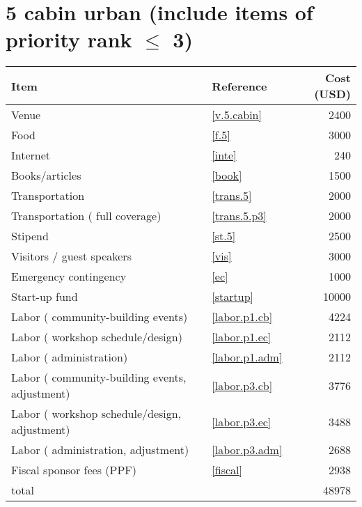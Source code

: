 \section*{5 cabin urban (include items of priority rank $\leq$ 3)}
\begin{center}
\begin{tabular}{llr}
Item & Reference & Cost (USD) \\ \hline
Venue & \ref{v.5.cabin} & 2400 \\
Food & \ref{f.5} & 3000 \\
Internet & \ref{inte} & 240 \\
Books/articles & \ref{book} & 1500 \\
Transportation & \ref{trans.5} & 2000 \\
Transportation ( full coverage) & \ref{trans.5.p3} & 2000 \\
Stipend & \ref{st.5} & 2500 \\
Visitors / guest speakers & \ref{vis} & 3000 \\
Emergency contingency & \ref{ec} & 1000 \\
Start-up fund & \ref{startup} & 10000 \\
Labor ( community-building events) & \ref{labor.p1.cb} & 4224 \\
Labor ( workshop schedule/design) & \ref{labor.p1.ec} & 2112 \\
Labor ( administration) & \ref{labor.p1.adm} & 2112 \\
Labor ( community-building events, adjustment) & \ref{labor.p3.cb} & 3776 \\
Labor ( workshop schedule/design, adjustment) & \ref{labor.p3.ec} & 3488 \\
Labor ( administration, adjustment) & \ref{labor.p3.adm} & 2688 \\
Fiscal sponsor fees (PPF) & \ref{fiscal} & 2938 \\ \hline
total &  & 48978
\end{tabular}
\end{center}
\newpage
